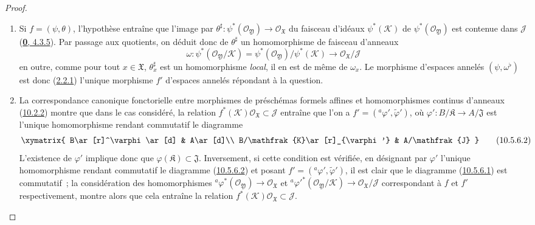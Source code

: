 \begin{proof}
\medskip\noindent
\begin{enumerate}
  \item[\rm{(i)}] Si $f=(\psi,\theta)$, l'hypothèse entraîne que
    l'image par
    $\theta^\sharp:\psi^*(\mathscr{O}_{\mathfrak{Y}})\to
    \mathscr{O}_{\mathfrak{X}}$ du faisceau d'idéaux
    $\psi^*(\mathscr{K})$ de $\psi^*(\mathscr{O}_{\mathfrak{Y}})$ est
    contenue dans $\mathscr{J}$
    (\hyperref[0.4.3.5-fr]{\textbf{0}, 4.3.5}). Par passage aux quotients, on
    déduit donc de $\theta^\sharp$ un homomorphisme de faisceau d'anneaux
    \[
      \omega:\psi^*(\mathscr{O}_{\mathfrak{Y}}/\mathscr{K})
      =\psi^*(\mathscr{O}_{\mathfrak{Y}})/\psi^*(\mathscr{K})
      \to\mathscr{O}_{\mathfrak{X}}/\mathscr{J}
    \]
    en outre, comme pour tout $x\in\mathfrak{X}$,
    $\theta_x^\sharp$ est un homomorphisme \emph{local}, il en est de
    même de $\omega_x$. Le morphisme d'espaces annelés
    $(\psi,\omega^\flat)$ est donc
    (\hyperref[I.2.2.1-fr]{2.2.1}) l'unique morphisme $f'$ d'espaces
    annelés répondant à la question.
  \item[\rm{(ii)}] La correspondance canonique fonctorielle entre
    morphismes de préschémas formels affines et homomorphismes continus
    d'anneaux (\hyperref[I.10.2.2-fr]{10.2.2}) montre que dans le cas
    considéré, la relation
    $f^*(\mathscr{K})\mathscr{O}_{\mathfrak{X}}\subset\mathscr{J}$
    entraîne que l'on a
    $f'=({}^a\varphi',\widetilde{\varphi}')$, où
    $\varphi':B/\mathfrak{K}\to A/\mathfrak{J}$ est l'unique
    homomorphisme rendant commutatif le diagramme
    \[
      \label{I.10.5.6.2-fr}
      \xymatrix{
        B\ar[r]^\varphi\ar[d] & A\ar[d]\\
        B/\mathfrak{K}\ar[r]_{\varphi'} & A/\mathfrak{J}
      }
      \tag{10.5.6.2}
    \]
    L'existence de $\varphi'$ implique donc que
    $\varphi(\mathfrak{K})\subset\mathfrak{J}$. Inversement, si cette
    condition est vérifiée, en désignant par $\varphi'$ l'unique
    homomorphisme rendant commutatif le diagramme
    (\hyperref[I.10.5.6.2-fr]{10.5.6.2}) et posant
    $f'=({}^a\varphi',\widetilde{\varphi}')$, il est clair que le
    diagramme (\hyperref[I.10.5.6.1-fr]{10.5.6.1}) est commutatif~; la
    considération des homomorphismes
    ${}^a\varphi^*(\mathscr{O}_{\mathfrak{Y}})\to
    \mathscr{O}_{\mathfrak{X}}$ et
    ${}^a{\varphi'}^*(\mathscr{O}_{\mathfrak{Y}}/\mathscr{K})\to
    \mathscr{O}_{\mathfrak{X}}/\mathscr{J}$ correspondant à $f$ et
    $f'$ respectivement, montre alors que cela entraîne la relation
    $f^*(\mathscr{K})\mathscr{O}_{\mathfrak{X}}\subset\mathscr{J}$.
\end{enumerate}
\end{proof}

